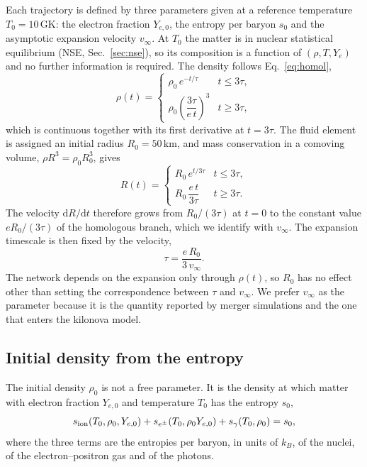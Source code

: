 Each trajectory is defined by three parameters given at a reference temperature $T_0=10\,\mathrm{GK}$: the electron fraction $Y_{e,0}$, the entropy per baryon $s_0$ and the asymptotic expansion velocity $v_\infty$.
At $T_0$ the matter is in nuclear statistical equilibrium (NSE, Sec.~\ref{sec:nse}), so its composition is a function of $(\rho,T,Y_e)$ and no further information is required.
The density follows Eq.~\ref{eq:homol},
\begin{equation}\label{eq:traj_density}
  \rho(t)=
  \begin{cases}
    \rho_0\,e^{-t/\tau} & t\leq3\tau,\\[2pt]
    \rho_0\left(\dfrac{3\tau}{e\,t}\right)^{3} & t\geq3\tau,
  \end{cases}
\end{equation}
which is continuous together with its first derivative at $t=3\tau$.
The fluid element is assigned an initial radius $R_0=50\,\mathrm{km}$, and mass conservation in a comoving volume, $\rho R^3=\rho_0R_0^3$, gives
\begin{equation}\label{eq:traj_radius}
  R(t)=
  \begin{cases}
    R_0\,e^{t/3\tau} & t\leq3\tau,\\[2pt]
    R_0\,\dfrac{e\,t}{3\tau} & t\geq3\tau.
  \end{cases}
\end{equation}
The velocity $\mathrm{d}R/\mathrm{d}t$ therefore grows from $R_0/(3\tau)$ at $t=0$ to the constant value $eR_0/(3\tau)$ of the homologous branch, which we identify with $v_\infty$.
The expansion timescale is then fixed by the velocity,
\begin{equation}\label{eq:tau_vinf}
  \tau=\frac{e\,R_0}{3\,v_\infty}.
\end{equation}
The network depends on the expansion only through $\rho(t)$, so $R_0$ has no effect other than setting the correspondence between $\tau$ and $v_\infty$.
We prefer $v_\infty$ as the parameter because it is the quantity reported by merger simulations and the one that enters the kilonova model.

\subsection{Initial density from the entropy}\label{sec:methods_rho0}

The initial density $\rho_0$ is not a free parameter.
It is the density at which matter with electron fraction $Y_{e,0}$ and temperature $T_0$ has the entropy $s_0$,
\begin{equation}\label{eq:rho0_condition}
  s_{\rm ion}(T_0,\rho_0,Y_{e,0})+s_{e^\pm}(T_0,\rho_0Y_{e,0})+s_\gamma(T_0,\rho_0)=s_0 ,
\end{equation}
where the three terms are the entropies per baryon, in units of $k_B$, of the nuclei, of the electron--positron gas and of the photons.

